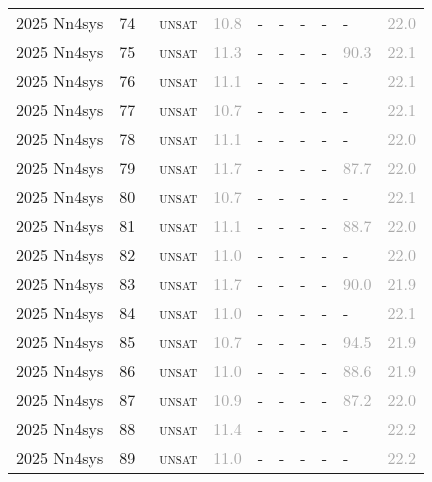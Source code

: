 \begin{center}
{\begin{longtable}{@{}llllllllll@{}}
2025 Nn4sys & 74 & ~\textsc{unsat} & \textcolor{darkgray}{10.8} & - & - & - & - & - & \textcolor{darkgray}{22.0} \\
2025 Nn4sys & 75 & ~\textsc{unsat} & \textcolor{darkgray}{11.3} & - & - & - & - & \textcolor{darkgray}{90.3} & \textcolor{darkgray}{22.1} \\
2025 Nn4sys & 76 & ~\textsc{unsat} & \textcolor{darkgray}{11.1} & - & - & - & - & - & \textcolor{darkgray}{22.1} \\
2025 Nn4sys & 77 & ~\textsc{unsat} & \textcolor{darkgray}{10.7} & - & - & - & - & - & \textcolor{darkgray}{22.1} \\
2025 Nn4sys & 78 & ~\textsc{unsat} & \textcolor{darkgray}{11.1} & - & - & - & - & - & \textcolor{darkgray}{22.0} \\
2025 Nn4sys & 79 & ~\textsc{unsat} & \textcolor{darkgray}{11.7} & - & - & - & - & \textcolor{darkgray}{87.7} & \textcolor{darkgray}{22.0} \\
2025 Nn4sys & 80 & ~\textsc{unsat} & \textcolor{darkgray}{10.7} & - & - & - & - & - & \textcolor{darkgray}{22.1} \\
2025 Nn4sys & 81 & ~\textsc{unsat} & \textcolor{darkgray}{11.1} & - & - & - & - & \textcolor{darkgray}{88.7} & \textcolor{darkgray}{22.0} \\
2025 Nn4sys & 82 & ~\textsc{unsat} & \textcolor{darkgray}{11.0} & - & - & - & - & - & \textcolor{darkgray}{22.0} \\
2025 Nn4sys & 83 & ~\textsc{unsat} & \textcolor{darkgray}{11.7} & - & - & - & - & \textcolor{darkgray}{90.0} & \textcolor{darkgray}{21.9} \\
2025 Nn4sys & 84 & ~\textsc{unsat} & \textcolor{darkgray}{11.0} & - & - & - & - & - & \textcolor{darkgray}{22.1} \\
2025 Nn4sys & 85 & ~\textsc{unsat} & \textcolor{darkgray}{10.7} & - & - & - & - & \textcolor{darkgray}{94.5} & \textcolor{darkgray}{21.9} \\
2025 Nn4sys & 86 & ~\textsc{unsat} & \textcolor{darkgray}{11.0} & - & - & - & - & \textcolor{darkgray}{88.6} & \textcolor{darkgray}{21.9} \\
2025 Nn4sys & 87 & ~\textsc{unsat} & \textcolor{darkgray}{10.9} & - & - & - & - & \textcolor{darkgray}{87.2} & \textcolor{darkgray}{22.0} \\
2025 Nn4sys & 88 & ~\textsc{unsat} & \textcolor{darkgray}{11.4} & - & - & - & - & - & \textcolor{darkgray}{22.2} \\
2025 Nn4sys & 89 & ~\textsc{unsat} & \textcolor{darkgray}{11.0} & - & - & - & - & - & \textcolor{darkgray}{22.2} \\

\end{longtable}}
\end{center}
